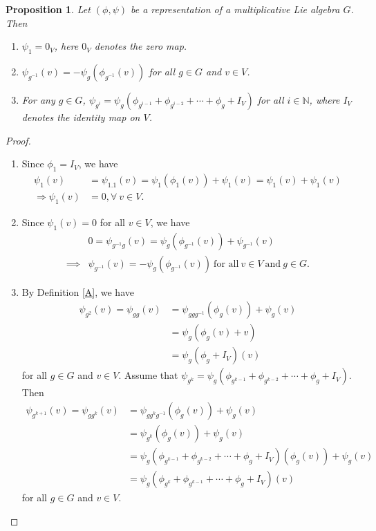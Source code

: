 \documentclass[10 pt,oneside,reqno,a4paper]{amsart}
\newtheorem{proposition}[theorem]{Proposition}
\numberwithin{equation}{section}
\newcommand{\field}[1]{\mathbb{#1}}          \newcommand{\Q}{\field{Q}}
\newcommand{\N}{\field{N}}
\begin{document}
\begin{proposition}\label{1}
    Let $(\phi,\psi)$ be a representation of a multiplicative Lie algebra $G$. Then
    
    \begin{enumerate}
        \item $\psi_1 = 0_V$, here $0_V$ denotes the zero map.
        \item $\psi_{g^{-1}}(v)= - \psi_{g}(\phi_{{g^{-1}}}(v))$ for all $g \in G$ and $v\in V$.
        \item  For any $g \in G$, $\psi_{g^i}=\psi_{g}(\phi_{g^{i-1}} + \phi_{g^{i-2}}+ \cdots + \phi_g+ I_V)$ for all $i \in \N$, where $I_V$ denotes the identity map on $V$.
    \end{enumerate} 
\end{proposition}

\begin{proof} 
\begin{enumerate}

\item Since $\phi_1 = I_V$, we have
\begin{align*}
   \psi_1(v) &=\psi_{1.1}(v)  = \psi_1(\phi_1(v)) + \psi_1(v) = \psi_1(v)+ \psi_1(v)\\
   \Rightarrow \psi_1(v) &= 0, \forall~  v\in V.
\end{align*}


\item  Since $\psi_1(v)=0$ for all $v\in V$, we have
\begin{align*}
 &0=\psi_{g^{-1}g}(v) =\psi_{g}(\phi_{g^{-1}}(v))+ \psi_{g^{-1}}(v) \\
 \implies & \psi_{g^{-1}}(v)= -\psi_{g}(\phi_{g^{-1}}(v)) ~\text{for all}~  v\in V ~\text{and}~g\in G.
\end{align*}
\item By Definition \ref{A}, we have
\begin{align*}
    \psi_{g^2}(v)=\psi_{gg}(v)&=\psi_{ggg^{-1}}(\phi_g(v)) + \psi_g(v)\\& = \psi_g(\phi_g(v)+ v)\\&= \psi_g(\phi_g + I_V)(v)
\end{align*}  for all $g\in G$ and $v\in V$. Assume that $\psi_{g^k}=\psi_{g}(\phi_{g^{k-1}} + \phi_{g^{k-2}}+ \cdots + \phi_g+ I_V)$. Then 
    \begin{align*}
    \psi_{g^{k+1}}(v)=\psi_{gg^k}(v)&=\psi_{gg^{k}g^{-1}}(\phi_g(v)) + \psi_g(v) \\&= \psi_{g^k}(\phi_g(v)) + \psi_g(v) \\&= \psi_{g}(\phi_{g^{k-1}} + \phi_{g^{k-2}}+ \cdots + \phi_g+ I_V)(\phi_g(v)) + \psi_g(v)\\&=\psi_g(\phi_{g^{k}} + \phi_{g^{k-1}}+ \cdots + \phi_g+ I_V)(v)
\end{align*} for all $g\in G$ and $v\in V$.
\end{enumerate}
\end{proof}
\end{document}
